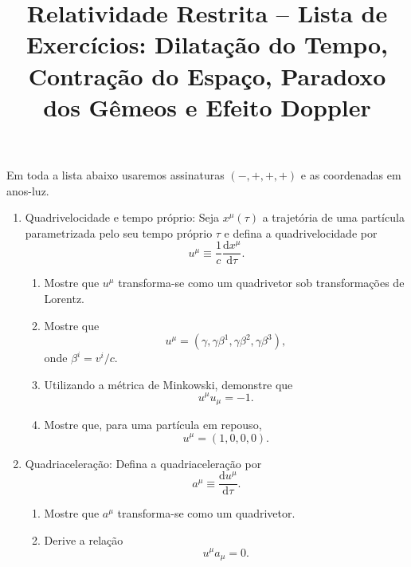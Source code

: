 \newif\ifuseseminar
\useseminartrue


\title{Relatividade Restrita -- Lista de Exercícios: Dilatação do Tempo, Contração do Espaço, Paradoxo dos Gêmeos e Efeito Doppler}



Em toda a lista abaixo usaremos assinaturas $(-,+,+,+)$ e as coordenadas em anos-luz.

\begin{enumerate}

      \item Quadrivelocidade e tempo próprio: Seja $x^\mu(\tau)$ a trajetória de uma
            partícula parametrizada pelo seu tempo próprio $\tau$ e defina a
            quadrivelocidade por
            $$
                  u^\mu \equiv \frac{1}{c}\frac{\mathrm{d}x^\mu}{\mathrm{d}\tau}.
            $$

            \begin{enumerate}
                  \item Mostre que $u^\mu$ transforma-se como um quadrivetor sob
                        transformações de Lorentz.

                  \item Mostre que
                        $$
                              u^\mu=(\gamma,\gamma\beta^1,\gamma\beta^2,\gamma\beta^3),
                        $$
                        onde $\beta^i=v^i/c$.

                  \item Utilizando a métrica de Minkowski, demonstre que
                        $$
                              u^\mu u_\mu=-1.
                        $$

                  \item Mostre que, para uma partícula em repouso,
                        $$
                              u^\mu=(1,0,0,0).
                        $$
            \end{enumerate}

      \item Quadriaceleração: Defina a quadriaceleração por
            $$
                  a^\mu\equiv\frac{\mathrm d u^\mu}{\mathrm d\tau}.
            $$

            \begin{enumerate}
                  \item Mostre que $a^\mu$ transforma-se como um quadrivetor.

                  \item Derive a relação
                        $$
                              u^\mu a_\mu=0.
                        $$


\end{enumerate}
\end{enumerate}
